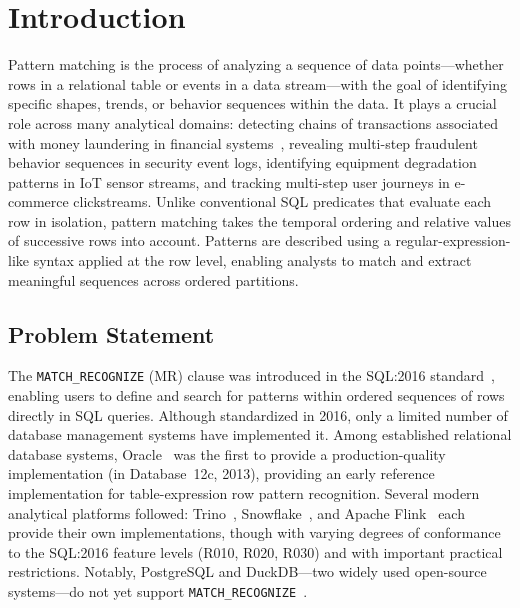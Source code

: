 \chapter{Introduction}
\label{chap:intro}

Pattern matching is the process of analyzing a sequence of data
points---whether rows in a relational table or events in a data
stream---with the goal of identifying specific shapes, trends, or
behavior sequences within the data.  It plays a crucial role
across many analytical domains: detecting chains of transactions
associated with money laundering in financial
systems~\cite{petkovic2022fraud}, revealing multi-step fraudulent
behavior sequences in security event logs, identifying equipment
degradation patterns in IoT sensor streams, and tracking multi-step
user journeys in e-commerce clickstreams.  Unlike conventional SQL
predicates that evaluate each row in isolation, pattern matching
takes the temporal ordering and relative values of successive rows
into account.  Patterns are described using a regular-expression-like
syntax applied at the row level, enabling analysts to match and
extract meaningful sequences across ordered partitions.

\section{Problem Statement}
\label{sec:intro-problem}

The \texttt{MATCH\_RECOGNIZE} (MR) clause was introduced in the
SQL:2016 standard~\cite{iso2016,ISO2021}, enabling users to define
and search for patterns within ordered sequences of rows directly
in SQL queries.  Although standardized in 2016, only
a limited number of database management systems have implemented it.
Among established relational database systems, Oracle~\cite{oracle2022,book}
was the first to provide a production-quality implementation (in
Database~12c, 2013), providing an early reference implementation
for table-expression row pattern recognition.
Several modern analytical platforms followed: Trino~\cite{trino2022,trino2021row},
Snowflake~\cite{snowflake2025match_recognize}, and Apache Flink~\cite{flink}
each provide their own implementations, though with varying degrees
of conformance to the SQL:2016 feature levels (R010, R020, R030)
and with important practical restrictions.  Notably, PostgreSQL
and DuckDB---two widely used open-source systems---do not yet
support \texttt{MATCH\_RECOGNIZE}~\cite{howe2020matchrecognize,findling2025bringing}.

